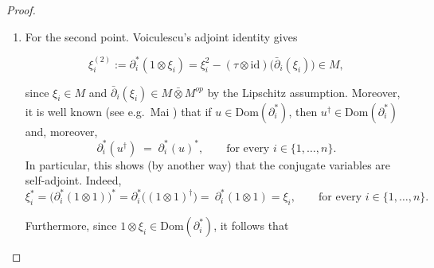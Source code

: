 \documentclass[10pt,a4paper,reqno]{amsart}
\newcommand{\Dom}{\mathrm{Dom}}
\begin{document}
\begin{proof}
\begin{enumerate}
\[
\bar\partial_j\Big(\sum_{i=1}^n [\xi_i,X_i]\Big)=\eta.
\]


Since $\sum_{i=1}^n[\xi_i,X_i]=0$ in $L^2(M)$, the left-hand side is $\bar\partial_j(0)=0$,
and hence $\eta=0$. Therefore,


\[
\xi_j\otimes 1 - 1\otimes \xi_j
 = \sum_{i=1}^n\Big((X_i\otimes 1)\,\bar\partial_j\xi_i
                    - \bar\partial_j\xi_i(1\otimes X_i)\Big),
\]



In particular, by the Lipschitz hypothesis, each $\bar\partial_j\xi_i\in M\bar\otimes M^{op}$,
so the right-hand side lies in $M\bar\otimes M^{op}$, whence also
$\xi_j\otimes 1 - 1\otimes \xi_j\in M\bar\otimes M^{op}$.
Applying $\mathrm{id}\otimes\tau$ yields a kind of non-commutative Clark–Ocone–Bismut formula (in analogy with the one in free Malliavin calculus on Wigner space as developped by Biane-Speicher\cite{BS})


\[
\xi_j - \tau(\xi_j).1
 = (\mathrm{id}\otimes\tau)\!\left[
     \sum_{i=1}^n\Big((X_i\otimes 1)\,\bar\partial_j\xi_i
                     - \bar\partial_j\xi_i(1\otimes X_i)\Big)
   \right]\in M.
\]


Thus $\xi_j\in M$ for all $j$.
\item For the second point. Voiculescu’s adjoint identity \cite[Proposition~4.1]{V} gives


\[
\xi_i^{(2)} := \partial_i^\ast(1\otimes \xi_i)
 = \xi_i^2 - (\tau\otimes\mathrm{id})\big(\bar\partial_i(\xi_i)\big)\in M,
\]


since $\xi_i\in M$ and $\bar\partial_i(\xi_i)\in M\bar\otimes M^{op}$ by the Lipschitz assumption.
\newline
Moreover, it is well known (see e.g.\ Mai \cite[Lemma~4.6]{Mai}) that if 
$u\in \Dom(\partial_i^\ast)$, then $u^{\dagger}\in \Dom(\partial_i^\ast)$ and, moreover,
\begin{equation}
    \partial_i^\ast(u^{\dagger}) \;=\; \partial_i^\ast(u)^\ast,
    \qquad \text{for every } i \in \{1,\ldots,n\}.
\end{equation}
In particular, this shows (by another way) that the conjugate variables are self-adjoint. Indeed,
\begin{equation}
    \xi_i^\ast 
    = \big(\partial_i^\ast(1\otimes 1)\big)^\ast
    = \partial_i^\ast\big((1\otimes 1)^{\dagger}\big)
    =\ \partial_i^\ast(1\otimes 1)
    = \xi_i,
    \qquad \text{for every } i \in \{1,\ldots,n\}.
\end{equation}

Furthermore, since $1\otimes \xi_i \in \Dom(\partial_i^\ast)$, it follows that



\end{enumerate}
\end{proof}
\end{document}
